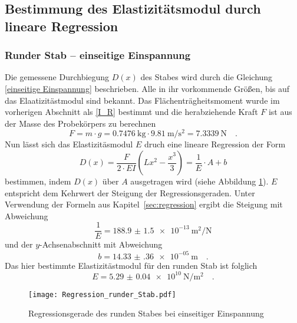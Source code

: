 \subsection{Bestimmung des Elastizitätsmodul durch lineare Regression}
\subsubsection{Runder Stab -- einseitige Einspannung}
Die gemessene Durchbiegung $D(x)$ des Stabes wird durch die Gleichung \eqref{einseitige Einspannung} beschrieben.
Alle in ihr vorkommende Größen, bis auf das Elaatizitästmodul sind bekannt. Das Flächenträgheitsmoment wurde im vorherigen Abschnitt als \eqref{I_R} bestimmt und die herabziehende Kraft $F$ ist aus der Masse des Probekörpers zu berechnen
\begin{equation}
  F = m \cdot g = \SI{0.7476}{\kilo\gram} \cdot \SI{9.81}{\metre\per\second\squared} = \SI{7.3339}{\newton} \quad .
\end{equation}
Nun lässt sich das Elastizitäsmodul $E$ druch eine lineare Regression der Form
\begin{equation}
  D(x) = \frac{F}{2\cdot E I}\left(Lx^2-\frac{x^3}{3}\right) = \frac{1}{E} \cdot A +b
\end{equation}
bestimmen, indem $D(x)$ über $A$ ausgetragen wird (siehe Abbildung \ref{fig:Regression_runder_Stab}). $E$ entspricht dem Kehrwert der Steigung der Regressionsgeraden. Unter Verwendung der Formeln aus Kapitel~\ref{sec:regression} ergibt die Steigung mit Abweichung
\begin{equation}
  \frac{1}{E}= \SI{188.9(15)e-13}{\metre\squared\per\newton}
\end{equation}
und der $y$-Achsenabschnitt mit Abweichung
\begin{equation}
  b = \SI{14.33(36)e-05}{\metre} \quad.
\end{equation}
Das hier bestimmte Elastizitästmodul für den runden Stab ist folglich
\begin{equation}
  E = \SI{5.29(4)e+10}{\newton\per\metre\squared} \quad.
\end{equation}

\begin{figure}
\centering
\texttt{[image: Regression\_runder\_Stab.pdf]}
\caption{Regressionsgerade des runden Stabes bei einseitiger Einspannung}
\label{fig:Regression_runder_Stab}
\end{figure}



